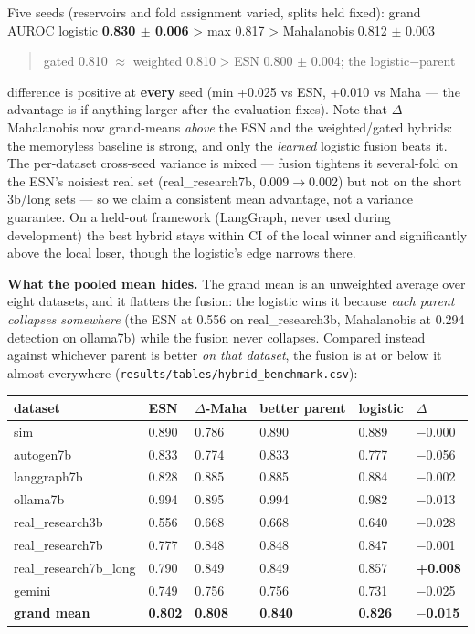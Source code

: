 \documentclass[11pt]{article}
\begin{document}
Five seeds (reservoirs and fold assignment varied, splits held fixed): grand AUROC logistic \textbf{0.830 $\pm$ 0.006} > max 0.817 > Mahalanobis 0.812 $\pm$ 0.003

\begin{quote}
gated 0.810 $\approx$ weighted 0.810 > ESN 0.800 $\pm$ 0.004; the logistic$-$parent
\end{quote}

difference is positive at \textbf{every} seed (min +0.025 vs ESN, +0.010 vs Maha --- the advantage is if anything larger after the evaluation fixes). Note that $\Delta$-Mahalanobis now grand-means \emph{above} the ESN and the weighted/gated hybrids: the memoryless baseline is strong, and only the \emph{learned} logistic fusion beats it. The per-dataset cross-seed variance is mixed --- fusion tightens it several-fold on the ESN's noisiest real set (real\_research7b, 0.009$\rightarrow$0.002) but not on the short 3b/long sets --- so we claim a consistent mean advantage, not a variance guarantee. On a held-out framework (LangGraph, never used during development) the best hybrid stays within CI of the local winner and significantly above the local loser, though the logistic's edge narrows there.


\textbf{What the pooled mean hides.} The grand mean is an unweighted average over eight datasets, and it flatters the fusion: the logistic wins it because \emph{each parent collapses somewhere} (the ESN at 0.556 on real\_research3b, Mahalanobis at 0.294 detection on ollama7b) while the fusion never collapses. Compared instead against whichever parent is better \emph{on that dataset}, the fusion is at or below it almost everywhere (\texttt{results/\allowbreak{}tables/\allowbreak{}hybrid\_\allowbreak{}benchmark.csv}):


\begin{longtable}{llllll}
\toprule
\textbf{dataset} & \textbf{ESN} & \textbf{$\Delta$-Maha} & \textbf{better parent} & \textbf{logistic} & \textbf{$\Delta$} \\
\midrule
\endhead
sim & 0.890 & 0.786 & 0.890 & 0.889 & $-$0.000 \\
autogen7b & 0.833 & 0.774 & 0.833 & 0.777 & $-$0.056 \\
langgraph7b & 0.828 & 0.885 & 0.885 & 0.884 & $-$0.002 \\
ollama7b & 0.994 & 0.895 & 0.994 & 0.982 & $-$0.013 \\
real\_research3b & 0.556 & 0.668 & 0.668 & 0.640 & $-$0.028 \\
real\_research7b & 0.777 & 0.848 & 0.848 & 0.847 & $-$0.001 \\
real\_research7b\_long & 0.790 & 0.849 & 0.849 & 0.857 & \textbf{+0.008} \\
gemini & 0.749 & 0.756 & 0.756 & 0.731 & $-$0.025 \\
\textbf{grand mean} & \textbf{0.802} & \textbf{0.808} & \textbf{0.840} & \textbf{0.826} & \textbf{$-$0.015} \\
\bottomrule
\end{longtable}
\end{document}
